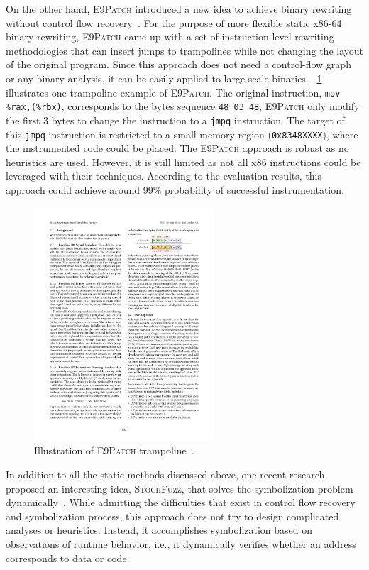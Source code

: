 On the other hand, \textsc{E9Patch} introduced a new idea to achieve binary rewriting without control flow recovery~\cite{duck2020binary}. For the purpose of more flexible static x86-64 binary rewriting, \textsc{E9Patch} came up with a set of instruction-level rewriting methodologies that can insert jumps to trampolines while not changing the layout of the original program. Since this approach does not need a control-flow graph or any binary analysis, it can be easily applied to large-scale binaries.
%
\F~\ref{fig:e9patch} illustrates one trampoline example of \textsc{E9Patch}. The original instruction, \texttt{mov \%rax,(\%rbx)}, corresponds to the bytes sequence \texttt{48 03 48}, \textsc{E9Patch} only modify the first 3 bytes to change the instruction to a \texttt{jmpq} instruction. The target of this \texttt{jmpq} instruction is restricted to a small memory region (\texttt{0x8348XXXX}), where the instrumented code could be placed. The \textsc{E9Patch} approach is robust as no heuristics are used. However, it is still limited as not all x86 instructions could be leveraged with their techniques. According to the evaluation results, this approach could achieve around 99\% probability of successful instrumentation.

\begin{figure}[tb]
  \centering
  \includegraphics[width=0.6\textwidth]{fig/E9Patch.pdf}
  \caption{Illustration of \textsc{E9Patch} trampoline~\cite{duck2020binary}.}
  \label{fig:e9patch}
\end{figure}

In addition to all the static methods discussed above, one recent research proposed an interesting idea, \textsc{StochFuzz}, that solves the symbolization problem dynamically~\cite{zhang2021stochfuzz}. While admitting the difficulties that exist in control flow recovery and symbolization process, this approach does not try to design complicated analyses or heuristics. Instead, it accomplishes symbolization based on observations of runtime behavior, i.e., it dynamically verifies whether an address corresponds to data or code.


